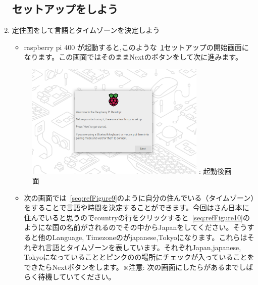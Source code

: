 \documentclass[a4paper,12pt]{jarticle}
\begin{document}
\begin{enumerate}
  \subsection{セットアップをしよう}
  \item 定住国をして言語とタイムゾーンを決定しよう
        \begin{itemize}
          \item
                raspberry pi 400 が起動すると,このような~\ref{seq:refFigure8}セットアップの開始画面になります。この画面ではそのままNextのボタンをして次に進みます。
        \end{itemize} 
        \begin{figure}[h]
          \centering
          \begin{minipage}{5.222cm}
          {\upshape
            \includegraphics[width=8.613cm]{sw_image01.png}
            \newline
            {\theFigure\label{seq:refFigure8}}:
            起動後画面
          }
        \end{minipage}
        \end{figure}

        \begin{itemize}
          \item
              次の画面では~\ref{seq:refFigure9}のように自分の住んでいる（タイムゾーン）をすることで言語や時間を決定することができます。今回はさん日本に住んでいると思うのでcountryの行をクリックすると~\ref{seq:refFigure10}のようにな国の名前がされるのでその中からJapanをしてください。そうすると他のLanguage, Timezoneのがjapanese,Tokyoになります。これらはそれぞれ言語とタイムゾーンを表しています。それぞれJapan,japanese, Tokyoになっていることとピンクのの場所にチェックが入っていることをできたらNextボタンをします。※注意: 次の画面にしたらがあるまでしばらく待機していてください。
            

\end{itemize}
\end{enumerate}
\end{document}

